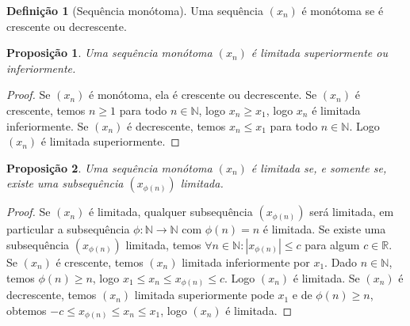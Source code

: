 \documentclass{article}
\newtheorem{prop}{Proposição}[section]
\theoremstyle{theorem}
\theoremstyle{lemma}
\theoremstyle{definition}
\newtheorem{definicao}{Definição}[section]
\theoremstyle{remark}
\begin{document}
\begin{definicao}[Sequência monótoma]
	Uma sequência $(x_n)$ é monótoma se é crescente ou decrescente. 
\end{definicao}
\begin{prop}
	Uma sequência monótoma $(x_n)$ é limitada superiormente ou inferiormente.
\end{prop}
\begin{proof}
	Se $(x_n)$ é monótoma, ela é crescente ou decrescente. Se $(x_n)$ é crescente, temos $ n \geq 1 $ para todo $n \in \mathbb{N}$, logo $x_n \geq x_1$, logo $x_n$ é limitada inferiormente. Se $(x_n)$ é decrescente, temos $x_n \leq x_1$ para todo $n\in \mathbb{N}$. Logo $(x_n)$ é limitada superiormente.
\end{proof}
\begin{prop}
	Uma sequência monótoma $(x_n)$ é limitada se, e somente se, existe uma subsequência $(x_{\phi(n)})$  limitada.
\end{prop}
\begin{proof}
	Se $(x_n)$ é limitada, qualquer subsequência $(x_{\phi(n)})$ será limitada, em particular a subsequência $\phi:\mathbb{N} \to \mathbb{N}$ com  $\phi(n) = n$ é limitada.
	Se existe uma subsequência $(x_{\phi(n)})$ limitada,  temos $\forall n \in \mathbb{N} : |x_{\phi(n)}| \leq c$ para algum $c\in \mathbb{R}$. Se $(x_n)$ é crescente, temos $(x_n)$ limitada inferiormente por $x_1$. Dado $n \in \mathbb{N}$, temos $\phi(n) \geq n$, logo $ x_1 \leq x_{n} \leq x_{\phi(n)} \leq c$. Logo $(x_n)$ é limitada.  Se $(x_n)$ é decrescente, temos $(x_n)$ limitada superiormente pode $x_1$ e de $\phi(n) \geq n$, obtemos $-c \leq x_{\phi(n)} \leq x_n \leq x_1 $, logo $(x_n)$ é limitada.
\end{proof}
\end{document}
